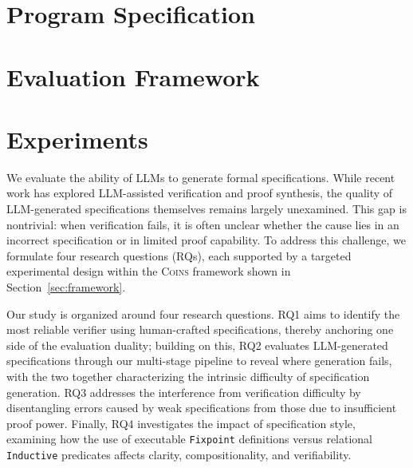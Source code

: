 \documentclass{article}
\theoremstyle{plain}
\theoremstyle{definition}
\theoremstyle{remark}
\begin{document}
\section{Program Specification}


\section{Evaluation Framework}


\section{Experiments}

We evaluate the ability of LLMs to generate formal specifications. While recent work has explored LLM-assisted verification and proof synthesis, the quality of LLM-generated specifications themselves remains largely unexamined. This gap is nontrivial: when verification fails, it is often unclear whether the cause lies in an incorrect specification or in limited proof capability. To address this challenge, we formulate four research questions (RQs), each supported by a targeted experimental design within the \textsc{Coins} framework shown in Section~\ref{sec:framework}.




Our study is organized around four research questions. RQ1 aims to identify the most reliable verifier using human-crafted specifications, thereby anchoring one side of the evaluation duality; building on this, RQ2 evaluates LLM-generated specifications through our multi-stage pipeline to reveal where generation fails, with the two together characterizing the intrinsic difficulty of specification generation. RQ3 addresses the interference from verification difficulty by disentangling errors caused by weak specifications from those due to insufficient proof power. Finally, RQ4 investigates the impact of specification style, examining how the use of executable \texttt{Fixpoint} definitions versus relational \texttt{Inductive} predicates affects clarity, compositionality, and verifiability.
\end{document}
